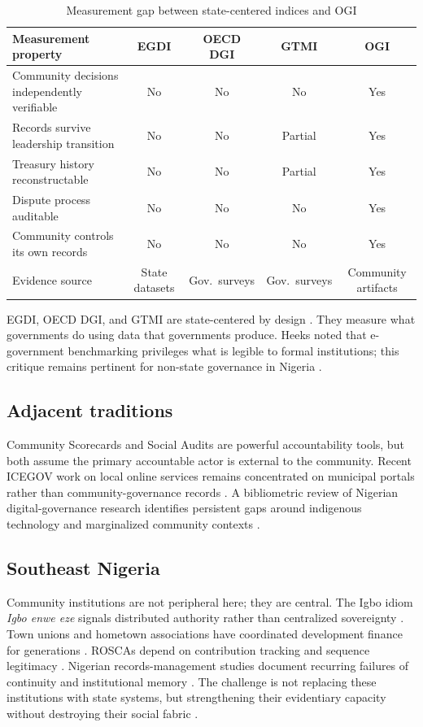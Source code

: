 \documentclass[sigconf]{acmart}
\begin{document}
\begin{table}[t]
\caption{Measurement gap between state-centered indices and OGI}
\label{tab:gap}
\small
\begin{tabularx}{\textwidth}{Ycccc}
\toprule
Measurement property & EGDI & OECD DGI & GTMI & OGI \\
\midrule
Community decisions independently verifiable & No & No & No & Yes \\
Records survive leadership transition & No & No & Partial & Yes \\
Treasury history reconstructable & No & No & Partial & Yes \\
Dispute process auditable & No & No & No & Yes \\
Community controls its own records & No & No & No & Yes \\
Evidence source & State datasets & Gov.\ surveys & Gov.\ surveys & Community artifacts \\
\bottomrule
\end{tabularx}
\end{table}

EGDI, OECD DGI, and GTMI are state-centered by design \cite{un2024,oecd2024,wb2025}. They measure what governments do using data that governments produce. Heeks \cite{heeks2006} noted that e-government benchmarking privileges what is legible to formal institutions; this critique remains pertinent for non-state governance in Nigeria \cite{heeks2002,heeks2003}.

\subsection{Adjacent traditions}

Community Scorecards \cite{singh2003} and Social Audits \cite{gaventa2013} are powerful accountability tools, but both assume the primary accountable actor is external to the community. Recent ICEGOV work on local online services remains concentrated on municipal portals rather than community-governance records \cite{guimaraes2025,kabanov2025}. A bibliometric review of Nigerian digital-governance research identifies persistent gaps around indigenous technology and marginalized community contexts \cite{ishola2025}.

\subsection{Southeast Nigeria}

Community institutions are not peripheral here; they are central. The Igbo idiom \textit{Igbo enwe eze} signals distributed authority rather than centralized sovereignty \cite{okafor2019}. Town unions and hometown associations have coordinated development finance for generations \cite{harneit2006,uduku2002}. ROSCAs depend on contribution tracking and sequence legitimacy \cite{ardener1964,besley1993,bouman1995}. Nigerian records-management studies document recurring failures of continuity and institutional memory \cite{adebayo2018}. The challenge is not replacing these institutions with state systems, but strengthening their evidentiary capacity without destroying their social fabric \cite{nwangwu2024}.
\end{document}
